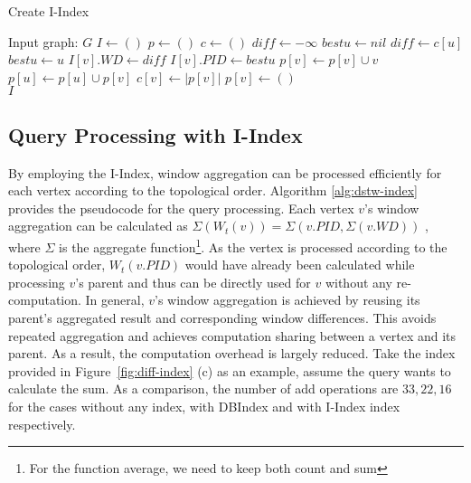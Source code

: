 \begin{algorithm}[h]
\label{alg:piconstruction}
\caption{Create I-Index}
\begin{algorithmic}[1]
\Require Input graph: $G$ 
\State $I \leftarrow ()$
\State $p \leftarrow ()$ 
\State $c \leftarrow ()$ 
\State $diff \leftarrow -\infty$ 
\State $bestu \leftarrow nil$
 \label{algo:tp-step1-start}
		\State $diff \leftarrow c[u]$
		\State $bestu \leftarrow u$
	\EndIf
\EndFor \label{algo:tp-step1-stop}
\State $I[v].WD \leftarrow diff$
\State $I[v].PID \leftarrow bestu$
\State $p[v] \leftarrow p[v] \cup v$
 \label{algo:tp-step2-start}
	\State $p[u] \leftarrow p[u] \cup p[v]$
\EndFor \label{algo:tp-step2-stop}
\State $c[v] \leftarrow |p[v]|$ 
\State $p[v] \leftarrow ()$ 
\EndFor \\
\Return $I$
\end{algorithmic}
\label{algo:piconstruction}
\end{algorithm}



\subsection{Query Processing with I-Index}
By employing the I-Index, window aggregation can be processed efficiently 
for each vertex according to 
the topological order. Algorithm \ref{alg:dstw-index} 
provides the pseudocode for the query processing. 
Each vertex $v$'s window aggregation can be calculated 
as 
$\Sigma (W_t(v)) = \Sigma (v.PID,\Sigma(v.WD))$
, where $\Sigma$ is the aggregate function\footnote{For the function average, we need to keep both count and sum}. As the vertex is 
processed according to the topological order, $W_t(v.PID)$ 
would have already been calculated while processing $v$'s parent and 
thus can be directly used for $v$ without any re-computation. 
In general, $v$'s window aggregation is achieved by reusing its 
parent's aggregated result and corresponding window differences.
This avoids repeated aggregation and achieves 
computation sharing between a vertex and its parent. 
As a result, the computation overhead is largely reduced. 
Take the index  provided in Figure~\ref{fig:diff-index} (c) as an example, 
assume the query wants to calculate the sum. As a comparison, the number of add operations 
are $33, 22, 16$ for the cases without any index, 
with DBIndex and with I-Index index respectively. 



